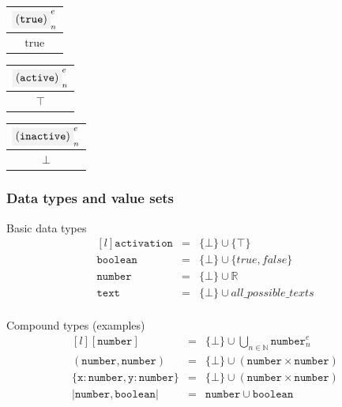 \begin{center}
\begin{tabular}{|c}
  $\codemath{(true)}_n^e$ \\
  \hline
  $\mathrm{true}$
\end{tabular}
\end{center}

\begin{center}
\begin{tabular}{|c}
  $\codemath{(active)}_n^e$ \\
  \hline
  $\top$
\end{tabular}
\end{center}

\begin{center}
\begin{tabular}{|c}
  $\codemath{(inactive)}_n^e$ \\
  \hline
  $\bot$
\end{tabular}
\end{center}




\subsubsection{Data types and value sets}

\noindent
Basic data types
\[
  \begin{matrix*}[l]
  \mathtt{activation} & = & \{ \bot\} \cup \{ \top\}\\
  \mathtt{boolean} & = & \{ \bot\} \cup \{ true, false\} \\
  \mathtt{number} & = & \{ \bot\} \cup \mathbb{R}\\
  \mathtt{text} & = & \{ \bot\} \cup all\_possible\_texts\\
\end{matrix*}
\]  

\noindent
Compound types (examples)
\[
  \begin{matrix*}[l]
  \mathtt{[number]} & = & \{ \bot\} \cup \bigcup_{n \in \mathbb{N}} \mathtt{number}_n^e \\
  \mathtt{(number,number)} & = & \{ \bot\} \cup ( \mathtt{number} \times \mathtt{number} ) \\
  \mathtt{\{x:number,y:number\}} & = & \{ \bot\} \cup ( \mathtt{number} \times \mathtt{number} ) \\
  \mathtt{|number,boolean|} & = & \mathtt{number} \cup \mathtt{boolean}  \\

\end{matrix*}
\]  


